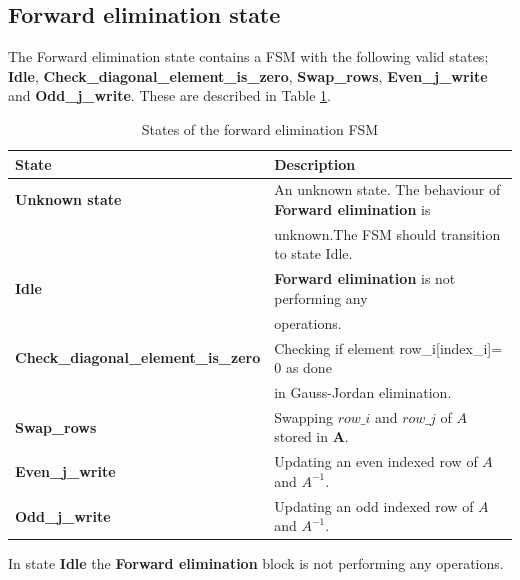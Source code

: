 \subsection{Forward elimination state}
The Forward elimination state contains a FSM with the following valid states; \textbf{Idle}, \textbf{Check\_diagonal\_element\_is\_zero}, \textbf{Swap\_rows}, \textbf{Even\_j\_write} and \textbf{Odd\_j\_write}. These are described in Table \ref{tab:fsm_forward_elimination}.

\begin{table}[H]
\centering
 \resizebox{1.\textwidth}{!}
{\begin{tabular}{l|l}
State                                                                                    & Description                                                                                   \\
\hline
\textbf{Unknown state}                                                                   & An unknown state. The behaviour of \textbf{Forward elimination} is \\ 
&unknown.The FSM should transition to state Idle.                                    \\
\textbf{Idle}                                                                            & \textbf{Forward elimination} is not performing any                                           \\
&operations.\\
\textbf{Check\_diagonal\_element\_is\_zero} & Checking if element row\_i[index\_i]= 0 as done\\ 
&in Gauss-Jordan elimination.     \\
\textbf{Swap\_rows}                                                            & Swapping $row\_i$ and $row\_j$ of  $A$ stored in \textbf{A}.        \\
\textbf{Even\_j\_write}                                                           & Updating an even indexed row of  $A$ and $A^{-1}$.       \\
\textbf{Odd\_j\_write}                                                                  & Updating an odd indexed row of  $A$ and $A^{-1}$.   
\end{tabular}}
\caption{States of the forward elimination FSM}
\label{tab:fsm_forward_elimination}

\end{table}

In state \textbf{Idle} the \textbf{Forward elimination} block is not performing any operations. \\

